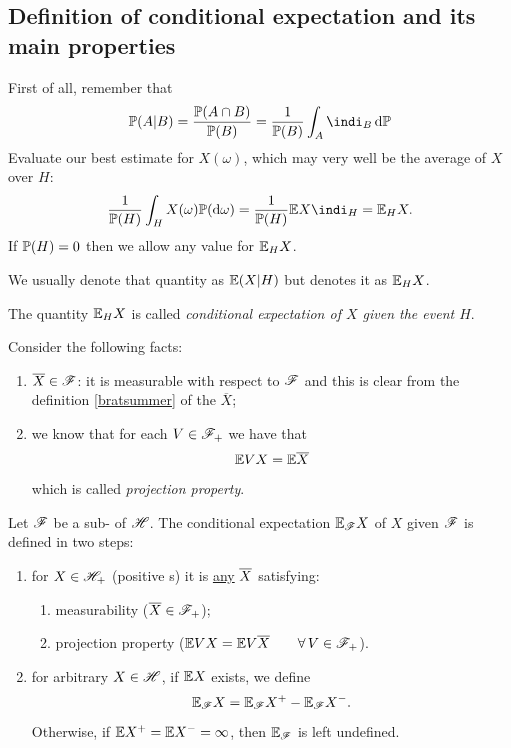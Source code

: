 \documentclass{report}
\begin{document}
\subsection{Definition of conditional expectation and its main properties}
First of all, remember that
\[\pr(A|B)=\frac{\pr(A\cap B)}{\pr(B)}=\frac{1}{\pr(B)}\int_A\indi_B\dpr\]
Evaluate our best estimate for $X(\omega)$, which may very well be the average of $X$ over $H$:
\begin{equation*}
	\frac{1}{\pr(H)}\int_H X(\omega)\pr(\dw)=\frac{1}{\pr(H)}\ev X\indi_H=\ev_H X.
\end{equation*}
If $\mathbb{P}(H)=0$ then we allow any value for $\mathbb{E}_H X$.
\begin{notation}
	We usually denote that quantity as $\mathbb{E}(X|H)$ but \cinlar denotes it as $\mathbb{E}_H X$.
\end{notation}
\begin{remark}
	The quantity $\mathbb{E}_H X$ is called \emph{conditional expectation of $X$ given the event $H$}.
\end{remark}
Consider the following facts:
\begin{enumerate}
	\item $\overline{X}\in\mathscr{F}$: it is measurable with respect to $\mathscr{F}$ and this is clear from the definition \ref{bratsummer} of the \rv{} $\overline{X}$;
	\item we know that for each $V\in\mathscr{F}_{+}$ we have that
	\[\mathbb{E} VX=\mathbb{E}\overline{X}\]
	which is called \emph{projection property}.
\end{enumerate}
\begin{definition}
	Let $\mathscr{F}$ be a sub-\sa{} of $\mathscr{H}$. The conditional expectation $\mathbb{E}_{\mathscr{F}} X$ of $X$ given $\mathscr{F}$ is defined in two steps:
	\begin{enumerate}[\circlet]
		\item for $X\in\mathscr{H}_{+}$ (positive \rv s) it is \underline{any} \rv{} $\overline{X}$ satisfying:
		\begin{enumerate}
			\item measurability ($\overline{X}\in\mathscr{F}_+$);
			\item projection property ($\mathbb{E} VX=\mathbb{E} V\overline{X}\qquad\forall\, V\in\mathscr{F}_+$).
		\end{enumerate}
		\item for arbitrary $X\in\mathscr{H}$, if $\mathbb{E} X$ exists, we define
		\[\mathbb{E}_{\mathscr{F}}X=\mathbb{E}_{\mathscr{F}}X^{+}-\mathbb{E}_{\mathscr{F}}X^{-}.\]
		Otherwise, if $\mathbb{E} X^{+}=\mathbb{E} X^{-}=\infty$, then $\mathbb{E}_{\mathscr{F}}$ is left undefined.
	\end{enumerate}
\end{definition}
\end{document}
